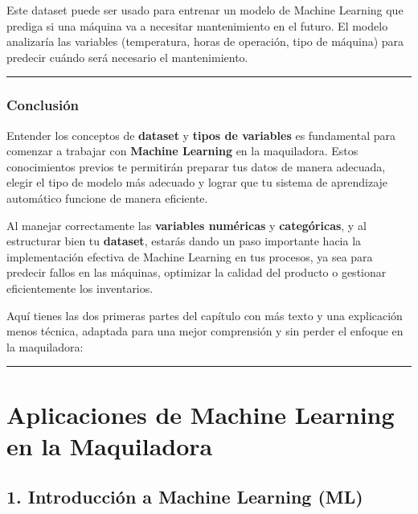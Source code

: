 \documentclass[
  10pt,
  letterpaper,
]{book}
\begin{document}
Este dataset puede ser usado para entrenar un modelo de Machine Learning
que prediga si una máquina va a necesitar mantenimiento en el futuro. El
modelo analizaría las variables (temperatura, horas de operación, tipo
de máquina) para predecir cuándo será necesario el mantenimiento.

\begin{center}\rule{0.5\linewidth}{0.5pt}\end{center}

\subsubsection{Conclusión}\label{conclusiuxf3n}

Entender los conceptos de \textbf{dataset} y \textbf{tipos de variables}
es fundamental para comenzar a trabajar con \textbf{Machine Learning} en
la maquiladora. Estos conocimientos previos te permitirán preparar tus
datos de manera adecuada, elegir el tipo de modelo más adecuado y lograr
que tu sistema de aprendizaje automático funcione de manera eficiente.

Al manejar correctamente las \textbf{variables numéricas} y
\textbf{categóricas}, y al estructurar bien tu \textbf{dataset}, estarás
dando un paso importante hacia la implementación efectiva de Machine
Learning en tus procesos, ya sea para predecir fallos en las máquinas,
optimizar la calidad del producto o gestionar eficientemente los
inventarios.

Aquí tienes las dos primeras partes del capítulo con más texto y una
explicación menos técnica, adaptada para una mejor comprensión y sin
perder el enfoque en la maquiladora:

\begin{center}\rule{0.5\linewidth}{0.5pt}\end{center}

\section{Aplicaciones de Machine Learning en la
Maquiladora}\label{aplicaciones-de-machine-learning-en-la-maquiladora}

\subsection{\texorpdfstring{\textbf{1. Introducción a Machine Learning
(ML)}}{1. Introducción a Machine Learning (ML)}}\label{introducciuxf3n-a-machine-learning-ml}
\end{document}
